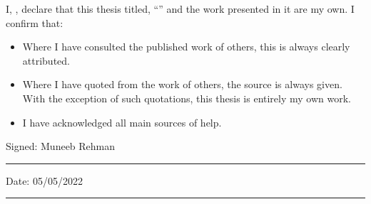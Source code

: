 
\begin{declaration}
\addchaptertocentry{\authorshipname} %
\noindent I, \authorname, declare that this thesis titled, \enquote{\ttitle} and the work presented in it are my own. I confirm that:

\begin{itemize} 
\item Where I have consulted the published work of others, this is always clearly attributed.
\item Where I have quoted from the work of others, the source is always given. With the exception of such quotations, this thesis is entirely my own work.
\item I have acknowledged all main sources of help.
\end{itemize}
 
\noindent Signed: Muneeb Rehman\\
\rule[0.5em]{25em}{0.5pt} %
 
\noindent Date: 05/05/2022\\
\rule[0.5em]{25em}{0.5pt} %
\end{declaration}

\cleardoublepage
